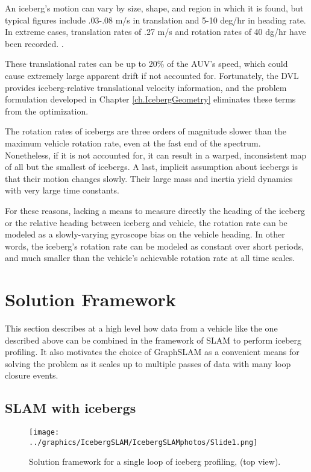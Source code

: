 An iceberg's motion can vary by size, shape, and region in which it is found, but typical figures include .03-.08 m/s in translation  and 5-10 deg/hr in heading rate. In extreme cases, translation rates of .27 m/s and rotation rates of 40 dg/hr have been recorded. \cite{Gladstone2002,Wadhams1983}. 

These translational rates can be up to 20\% of the AUV's speed, which could cause extremely large apparent drift if not accounted for. Fortunately, the DVL provides iceberg-relative translational velocity information, and the problem formulation developed in Chapter \ref{ch.IcebergGeometry} eliminates these terms from the optimization.

The rotation rates of icebergs are three orders of magnitude slower than the maximum vehicle rotation rate, even at the fast end of the spectrum. Nonetheless, if it is not accounted for, it can result in a warped, inconsistent map of all but the smallest of icebergs. A last, implicit assumption about icebergs is that their motion changes slowly. Their large mass and inertia yield dynamics with very large time constants. 

For these reasons, lacking a means to measure directly the heading of the iceberg or the relative heading between iceberg and vehicle, the rotation rate can be modeled as a slowly-varying gyroscope bias on the vehicle heading. In other words, the iceberg's rotation rate can be modeled as constant over short periods, and much smaller than the vehicle's achievable rotation rate at all time scales.

\section{Solution Framework}

This section describes at a high level how data from a vehicle like the one described above can be combined in the framework of SLAM to perform iceberg profiling. It also motivates the choice of GraphSLAM as a convenient means for solving the problem as it scales up to multiple passes of data with many loop closure events.

\subsection{SLAM with icebergs}

\begin{figure}[htb]
   \centering
   \texttt{[image: ../graphics/IcebergSLAM/IcebergSLAMphotos/Slide1.png]} %
   \caption{Solution framework for a single loop of iceberg profiling, (top view). }
   \label{fig:icebergSLAM}
\end{figure}

